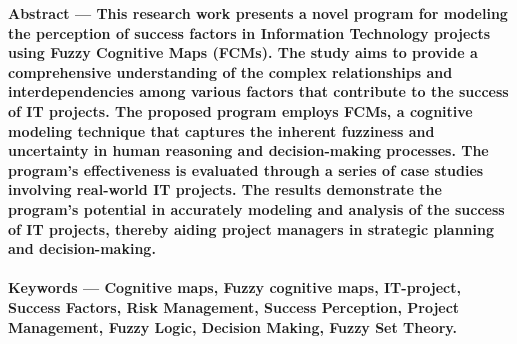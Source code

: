 \documentclass{article}
\begin{document}
    \begin{minipage}{0.49\textwidth}
        \textbf{Abstract — This research work presents a novel program for modeling the perception of success factors in Information Technology projects using Fuzzy Cognitive Maps (FCMs). The study aims to provide a comprehensive understanding of the complex relationships and interdependencies among various factors that contribute to the success of IT projects. The proposed program employs FCMs, a cognitive modeling technique that captures the inherent fuzziness and uncertainty in human reasoning and decision-making processes. The program's effectiveness is evaluated through a series of case studies involving real-world IT projects. The results demonstrate the program's potential in accurately modeling and analysis of the success of IT projects, thereby aiding project managers in strategic planning and decision-making.}\\
        ~\\
        \textbf{Keywords — Cognitive maps, Fuzzy cognitive maps, IT-project, Success Factors, Risk Management, Success Perception, Project Management, Fuzzy Logic, Decision Making, Fuzzy Set Theory.}\\
        ~\\
        \begin{center}

\end{center}
\end{minipage}
\end{document}
